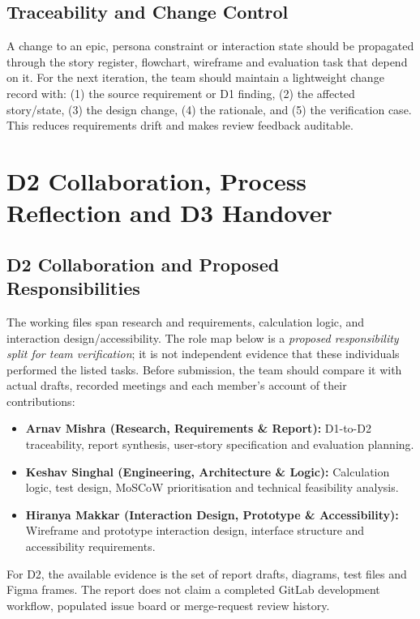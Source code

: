 \documentclass[12pt,a4paper]{article}
\begin{document}
\subsection{Traceability and Change Control}
A change to an epic, persona constraint or interaction state should be propagated through the story register, flowchart, wireframe and evaluation task that depend on it. For the next iteration, the team should maintain a lightweight change record with: (1) the source requirement or D1 finding, (2) the affected story/state, (3) the design change, (4) the rationale, and (5) the verification case. This reduces requirements drift and makes review feedback auditable.

\clearpage
\section{D2 Collaboration, Process Reflection and D3 Handover}

\subsection{D2 Collaboration and Proposed Responsibilities}
The working files span research and requirements, calculation logic, and interaction design/accessibility. The role map below is a \emph{proposed responsibility split for team verification}; it is not independent evidence that these individuals performed the listed tasks. Before submission, the team should compare it with actual drafts, recorded meetings and each member's account of their contributions:
\begin{itemize}[leftmargin=*]
  \item \textbf{Arnav Mishra (Research, Requirements \& Report):} D1-to-D2 traceability, report synthesis, user-story specification and evaluation planning.
  \item \textbf{Keshav Singhal (Engineering, Architecture \& Logic):} Calculation logic, test design, MoSCoW prioritisation and technical feasibility analysis.
  \item \textbf{Hiranya Makkar (Interaction Design, Prototype \& Accessibility):} Wireframe and prototype interaction design, interface structure and accessibility requirements.
\end{itemize}
For D2, the available evidence is the set of report drafts, diagrams, test files and Figma frames. The report does not claim a completed GitLab development workflow, populated issue board or merge-request review history.
\end{document}
